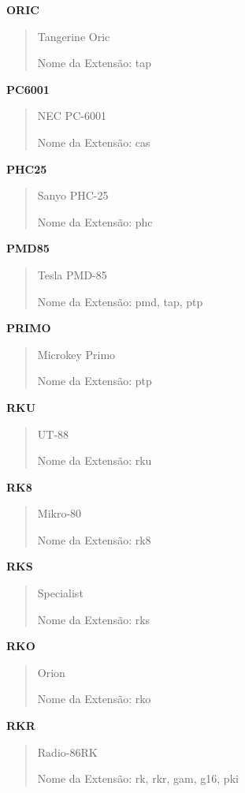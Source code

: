\documentclass[letterpaper,10pt,brazil]{sphinxmanual}
\begin{document}
\textbf{ORIC}
\begin{quote}

Tangerine Oric

Nome da Extensão: tap
\end{quote}

\textbf{PC6001}
\begin{quote}

NEC PC-6001

Nome da Extensão: cas
\end{quote}

\textbf{PHC25}
\begin{quote}

Sanyo PHC-25

Nome da Extensão: phc
\end{quote}

\textbf{PMD85}
\begin{quote}

Tesla PMD-85

Nome da Extensão: pmd, tap, ptp
\end{quote}

\textbf{PRIMO}
\begin{quote}

Microkey Primo

Nome da Extensão: ptp
\end{quote}

\textbf{RKU}
\begin{quote}

UT-88

Nome da Extensão: rku
\end{quote}

\textbf{RK8}
\begin{quote}

Mikro-80

Nome da Extensão: rk8
\end{quote}

\textbf{RKS}
\begin{quote}

Specialist

Nome da Extensão: rks
\end{quote}

\textbf{RKO}
\begin{quote}

Orion

Nome da Extensão: rko
\end{quote}

\textbf{RKR}
\begin{quote}

Radio-86RK

Nome da Extensão: rk, rkr, gam, g16, pki
\end{quote}
\end{document}
